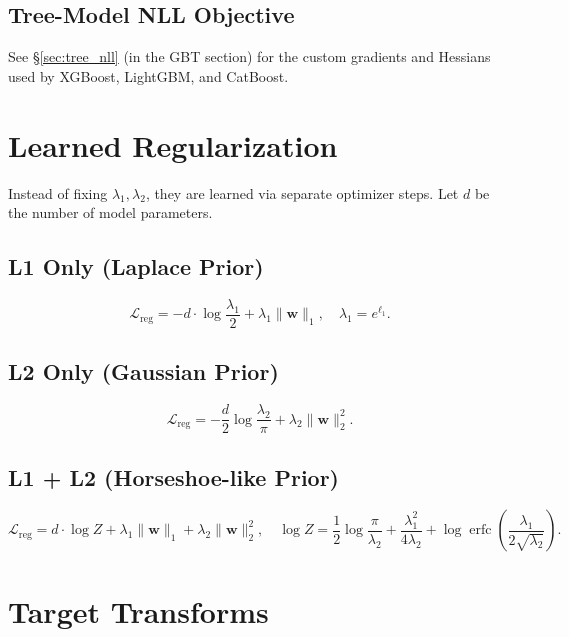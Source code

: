 \documentclass[11pt,a4paper]{article}
\theoremstyle{definition}
\newcommand{\bw}{\mathbf{w}}
\DeclareMathOperator{\erfc}{erfc}
\begin{document}
\subsection{Tree-Model NLL Objective}

See \S\ref{sec:tree_nll} (in the GBT section) for the custom gradients and
Hessians used by XGBoost, LightGBM, and CatBoost.

\section{Learned Regularization}
\label{sec:learned_reg}

Instead of fixing $\lambda_1, \lambda_2$, they are learned via
separate optimizer steps. Let $d$ be the number of model parameters.

\subsection{L1 Only (Laplace Prior)}

\[
  \mathcal{L}_{\mathrm{reg}} = -d \cdot \log\frac{\lambda_1}{2} + \lambda_1 \|\bw\|_1,
  \quad \lambda_1 = e^{\ell_1}.
\]

\subsection{L2 Only (Gaussian Prior)}

\[
  \mathcal{L}_{\mathrm{reg}} = -\frac{d}{2} \log\frac{\lambda_2}{\pi} + \lambda_2 \|\bw\|_2^2.
\]

\subsection{L1 + L2 (Horseshoe-like Prior)}

\[
  \mathcal{L}_{\mathrm{reg}} = d \cdot \log Z + \lambda_1 \|\bw\|_1 + \lambda_2 \|\bw\|_2^2,
  \quad
  \log Z = \frac{1}{2}\log\frac{\pi}{\lambda_2} + \frac{\lambda_1^2}{4\lambda_2} + \log\erfc\!\left(\frac{\lambda_1}{2\sqrt{\lambda_2}}\right).
\]

\section{Target Transforms}
\label{sec:transforms}
\end{document}
